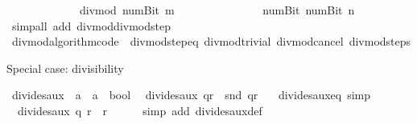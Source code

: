 \begin{isabellebody}
\ \ \ \ \ \ \ \ \ \ \ \ \ {\isacharparenleft}{\kern0pt}divmod\ {\isacharparenleft}{\kern0pt}num{\isachardot}{\kern0pt}Bit{}\ m{\isacharparenright}{\kern0pt}\isanewline
\ \ \ \ \ \ \ \ \ \ \ \ \ \ \ {\isacharparenleft}{\kern0pt}num{\isachardot}{\kern0pt}Bit{}\ {\isacharparenleft}{\kern0pt}num{\isachardot}{\kern0pt}Bit{}\ n{\isacharparenright}{\kern0pt}{\isacharparenright}{\kern0pt}{\isacharparenright}{\kern0pt}{\isacharparenright}{\kern0pt}{\isachardoublequoteclose}\isanewline
%
\isadelimproof
\ \ %
\endisadelimproof
%
\isatagproof
{}\isamarkupfalse%
\ {\isacharparenleft}{\kern0pt}simp{\isacharunderscore}{\kern0pt}all\ add{\isacharcolon}{\kern0pt}\ divmod{\isacharunderscore}{\kern0pt}divmod{\isacharunderscore}{\kern0pt}step{\isacharparenright}{\kern0pt}%
\endisatagproof
{\isafoldproof}%
%
\isadelimproof
\isanewline
%
\endisadelimproof
\isanewline
{}\isamarkupfalse%
\ divmod{\isacharunderscore}{\kern0pt}algorithm{\isacharunderscore}{\kern0pt}code\ {\isacharequal}{\kern0pt}\ divmod{\isacharunderscore}{\kern0pt}step{\isacharunderscore}{\kern0pt}eq\ divmod{\isacharunderscore}{\kern0pt}trivial\ divmod{\isacharunderscore}{\kern0pt}cancel\ divmod{\isacharunderscore}{\kern0pt}steps%
\begin{isamarkuptext}%
Special case: divisibility%
\end{isamarkuptext}\isamarkuptrue%
\isamarkupfalse%
\ divides{\isacharunderscore}{\kern0pt}aux\ {\isacharcolon}{\kern0pt}{\isacharcolon}{\kern0pt}\ {\isachardoublequoteopen}{\isacharprime}{\kern0pt}a\ {\isasymtimes}\ {\isacharprime}{\kern0pt}a\ {\isasymRightarrow}\ bool{\isachardoublequoteclose}\isanewline
{}\isanewline
\ \ {\isachardoublequoteopen}divides{\isacharunderscore}{\kern0pt}aux\ qr\ {\isasymlongleftrightarrow}\ snd\ qr\ {\isacharequal}{\kern0pt}\ {}{\isachardoublequoteclose}\isanewline
\isanewline
{}\isamarkupfalse%
\ divides{\isacharunderscore}{\kern0pt}aux{\isacharunderscore}{\kern0pt}eq\ {\isacharbrackleft}{\kern0pt}simp{\isacharbrackright}{\kern0pt}{\isacharcolon}{\kern0pt}\isanewline
\ \ {\isachardoublequoteopen}divides{\isacharunderscore}{\kern0pt}aux\ {\isacharparenleft}{\kern0pt}q{\isacharcomma}{\kern0pt}\ r{\isacharparenright}{\kern0pt}\ {\isasymlongleftrightarrow}\ r\ {\isacharequal}{\kern0pt}\ {}{\isachardoublequoteclose}\isanewline
%
\isadelimproof
\ \ %
\endisadelimproof
%
\isatagproof
{}\isamarkupfalse%
\ {\isacharparenleft}{\kern0pt}simp\ add{\isacharcolon}{\kern0pt}\ divides{\isacharunderscore}{\kern0pt}aux{\isacharunderscore}{\kern0pt}def{\isacharparenright}{\kern0pt}%

\end{isabellebody}
